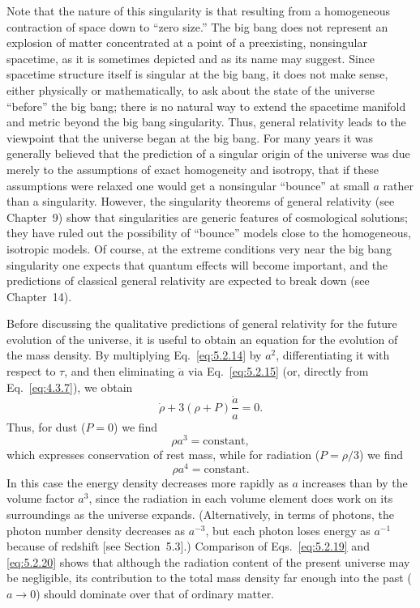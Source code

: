 Note that the nature of this singularity is that resulting from a homogeneous
contraction of space down to ``zero size.'' The big bang does not represent an
explosion of matter concentrated at a point of a preexisting, nonsingular spacetime,
as it is sometimes depicted and as its name may suggest. Since spacetime structure
itself is singular at the big bang, it does not make sense, either physically or
mathematically, to ask about the state of the universe ``before'' the big bang; there
is no natural way to extend the spacetime manifold and metric beyond the big bang
singularity. Thus, general relativity leads to the viewpoint that the universe began at
the big bang. For many years it was generally believed that the prediction of a
singular origin of the universe was due merely to the assumptions of exact homogeneity
and isotropy, that if these assumptions were relaxed one would get a nonsingular
``bounce'' at small \(a\) rather than a singularity. However, the singularity theorems
of general relativity (see Chapter~9) show that singularities are generic features of
cosmological solutions; they have ruled out the possibility of ``bounce'' models close
to the homogeneous, isotropic models. Of course, at the extreme conditions very near
the big bang singularity one expects that quantum effects will become important, and
the predictions of classical general relativity are expected to break down (see
Chapter~14).

Before discussing the qualitative predictions of general relativity for the future
evolution of the universe, it is useful to obtain an equation for the evolution of the
mass density. By multiplying Eq.~\eqref{eq:5.2.14} by \(a^2\), differentiating it
with respect to \(\tau\), and then eliminating \(\ddot a\) via
Eq.~\eqref{eq:5.2.15} (or, directly from Eq.~\eqref{eq:4.3.7}), we obtain
\begin{equation}
  \dot\rho+3(\rho+P)\frac{\dot a}{a}=0.
  \tag{5.2.18}\label{eq:5.2.18}
\end{equation}
Thus, for dust (\(P=0\)) we find
\begin{equation}
  \rho a^3=\text{constant},
  \tag{5.2.19}\label{eq:5.2.19}
\end{equation}
which expresses conservation of rest mass, while for radiation (\(P=\rho/3\)) we
find
\begin{equation}
  \rho a^4=\text{constant}.
  \tag{5.2.20}\label{eq:5.2.20}
\end{equation}
In this case the energy density decreases more rapidly as \(a\) increases than by the
volume factor \(a^3\), since the radiation in each volume element does work on its
surroundings as the universe expands. (Alternatively, in terms of photons, the photon
number density decreases as \(a^{-3}\), but each photon loses energy as \(a^{-1}\)
because of redshift [see Section~5.3].) Comparison of Eqs.~\eqref{eq:5.2.19} and
\eqref{eq:5.2.20} shows that although the radiation content of the present universe
may be negligible, its contribution to the total mass density far enough into the past
(\(a\to0\)) should dominate over that of ordinary matter.

